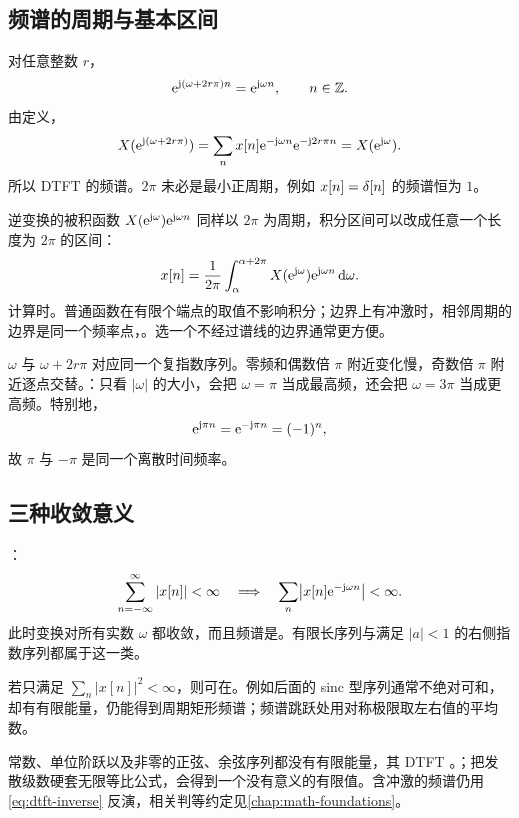 \subsection{频谱的周期与基本区间}
\label{sec:dtft-periodicity}

对任意整数 $r$，
\[
  \mathrm{e}^{\mathrm{j}(\omega+2r\pi)n}=\mathrm{e}^{\mathrm{j}\omega n},\qquad n\in\mathbb{Z}.
\]
由定义，
\begin{equation}
  X(\mathrm{e}^{\mathrm{j}(\omega+2r\pi)})
  =\sum_n x[n]\mathrm{e}^{-\mathrm{j}\omega n}\mathrm{e}^{-\mathrm{j}2r\pi n}
  =X(\mathrm{e}^{\mathrm{j}\omega}).
  \label{eq:dtft-periodicity}
\end{equation}
所以 DTFT 的频谱。$2\pi$ 未必是最小正周期，例如 $x[n]=\delta[n]$ 的频谱恒为 $1$。

逆变换的被积函数 $X(\mathrm{e}^{\mathrm{j}\omega})\mathrm{e}^{\mathrm{j}\omega n}$ 同样以 $2\pi$ 为周期，积分区间可以改成任意一个长度为 $2\pi$ 的区间：
\[
  x[n]=\frac{1}{2\pi}\int_{\alpha}^{\alpha+2\pi}
    X(\mathrm{e}^{\mathrm{j}\omega})\mathrm{e}^{\mathrm{j}\omega n}\mathop{}\!\mathrm{d}\omega.
\]
计算时。普通函数在有限个端点的取值不影响积分；边界上有冲激时，相邻周期的边界是同一个频率点，。选一个不经过谱线的边界通常更方便。

$\omega$ 与 $\omega+2r\pi$ 对应同一个复指数序列。零频和偶数倍 $\pi$ 附近变化慢，奇数倍 $\pi$ 附近逐点交替。：只看 $|\omega|$ 的大小，会把 $\omega=\pi$ 当成最高频，还会把 $\omega=3\pi$ 当成更高频。特别地，
\[
  \mathrm{e}^{\mathrm{j}\pi n}=\mathrm{e}^{-\mathrm{j}\pi n}=(-1)^n,
\]
故 $\pi$ 与 $-\pi$ 是同一个离散时间频率。

\subsection{三种收敛意义}

：
\[
  \sum_{n=-\infty}^{\infty}|x[n]|<\infty
  \quad\Longrightarrow\quad
  \sum_n\bigl|x[n]\mathrm{e}^{-\mathrm{j}\omega n}\bigr|<\infty.
\]
此时变换对所有实数 $\omega$ 都收敛，而且频谱是。有限长序列与满足 $|a|<1$ 的右侧指数序列都属于这一类。

若只满足 $\sum_n|x[n]|^2<\infty$，则可在。例如后面的 sinc 型序列通常不绝对可和，却有有限能量，仍能得到周期矩形频谱；频谱跳跃处用对称极限取左右值的平均数。

常数、单位阶跃以及非零的正弦、余弦序列都没有有限能量，其 DTFT 。；把发散级数硬套无限等比公式，会得到一个没有意义的有限值。含冲激的频谱仍用\cref{eq:dtft-inverse} 反演，相关判等约定见\cref{chap:math-foundations}。


